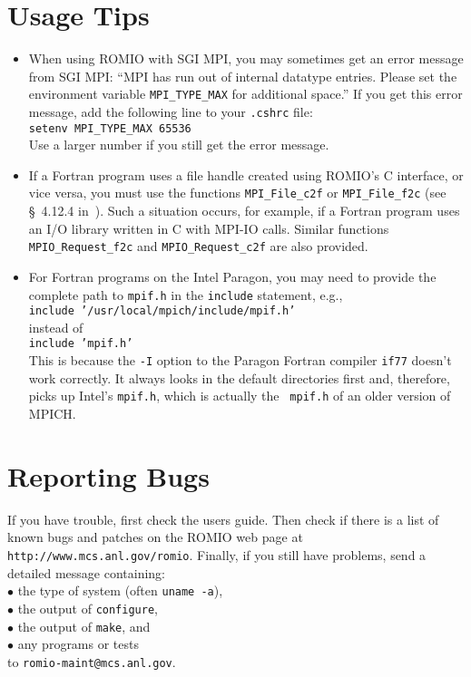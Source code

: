 \section{Usage Tips}
\begin{itemize}
\item When using ROMIO with SGI MPI, you may
sometimes get an error message from SGI MPI: ``MPI has run out of
internal datatype entries. Please set the environment variable
{\tt MPI\_TYPE\_MAX} for additional space.'' If you get this error message,
add the following line to your {\tt .cshrc} file:\\
\hspace*{.4in} {\tt setenv MPI\_TYPE\_MAX 65536}\\
Use a larger number if you still get the error message.
\item If a Fortran program uses a file handle created using ROMIO's C
interface, or vice versa, you must use the functions {\tt MPI\_File\_c2f} 
or {\tt MPI\_File\_f2c} (see \S~4.12.4 in~\cite{mpi97a}). Such a
situation occurs, for example, if a Fortran program uses an I/O
library written in C 
with MPI-IO calls. Similar functions {\tt MPIO\_Request\_f2c} and
{\tt MPIO\_Request\_c2f} are also provided.
\item For Fortran programs on the Intel Paragon, you may need
to provide the complete path to {\tt mpif.h} in the {\tt include}
statement, e.g., \\
\hspace*{.4in} {\tt include '/usr/local/mpich/include/mpif.h'}\\
instead of \\
\hspace*{.4in} {\tt include 'mpif.h'}\\ 
This is because the {\tt -I}
option to the Paragon Fortran compiler {\tt if77} doesn't work
correctly. It always looks in the default directories first and,
therefore, picks up Intel's {\tt mpif.h}, which is actually the {\tt
mpif.h} of an older version of MPICH.

\end{itemize}

%
%
%
%
\section{Reporting Bugs}
If you have trouble, first check the users guide. Then check if there
is a list of known bugs and patches on the ROMIO web page at {\tt
http://www.mcs.anl.gov/romio}.  Finally, if you still have problems, send a
detailed message containing:\\
\hspace*{.2in}$\bullet$ the type of system (often {\tt uname -a}),\\
\hspace*{.2in}$\bullet$ the output of {\tt configure},\\
\hspace*{.2in}$\bullet$ the output of {\tt make}, and \\
\hspace*{.2in}$\bullet$ any programs or tests\\
to {\tt romio-maint@mcs.anl.gov}.


